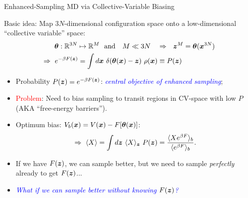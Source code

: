 \documentclass[10pt]{beamer}
\begin{document}
\begin{frame}[fragile]{Enhanced-Sampling MD via Collective-Variable Biasing}

Basic idea:  Map $3N$-dimensional configuration space onto a low-dimensional 
``collective variable'' space:
\begin{align*}
\thetab : \mathbb{R}^{3N}\mapsto\mathbb{R}^{M} \ \ \mbox{and}\ \ \ M \ll 3N\ \ \ 
&\Rightarrow\ \ \zb^{M} = \thetab(\xb^{3N})\\
\Rightarrow\ e^{-\beta F(\zb)} = \int d\xb \ 
\delta(\thetab(\xb)-\zb)\ \rho(\xb) & \equiv P(\zb)
\end{align*}
\vspace{-0.5cm}
\begin{itemize}
\item Probability $P({\boldsymbol z}) = e^{-\beta F({\boldsymbol z})}$:  \textcolor{blue}{\em central objective of 
enhanced sampling};
\item \textcolor{red}{Problem}: Need to bias sampling to transit regions in CV-space with low $P$ (AKA ``free-energy barriers'').
\item \textcolor{green!80!black}{Optimum bias}: $\displaystyle V_b({\boldsymbol x}) = V({\boldsymbol x}) - F[{\boldsymbol \theta}({\boldsymbol x})]$:
\begin{displaymath}
\Rightarrow\ \langle X \rangle = \int d\zb\ \langle X\rangle_{\zb}\  P(\zb) = \frac{\langle X e^{\beta F}\rangle_b}{\langle e^{\beta F}\rangle_b}.
\end{displaymath}
\item If we have $F({\boldsymbol z})$, we can sample better, but we need to sample {\em perfectly} already to get $F({\boldsymbol z})$...
\item \textcolor{blue}{\it What if we can sample better without knowing $F({\boldsymbol z})$?}
\end{itemize}
\end{frame}
\end{document}
